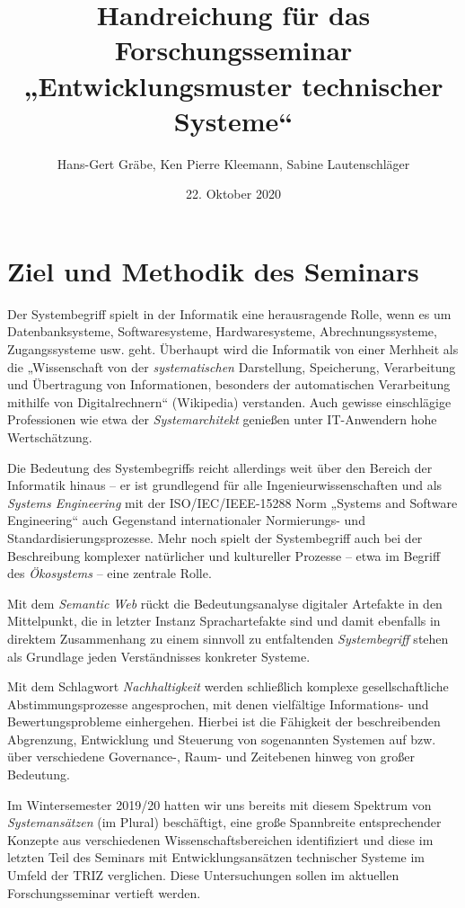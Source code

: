 \documentclass[11pt,a4paper]{article}
\title{Handreichung für das Forschungsseminar\\ „Entwicklungsmuster
  technischer Systeme“}
\author{Hans-Gert Gr\"abe, Ken Pierre Kleemann, Sabine Lautenschläger}
\date{22. Oktober 2020}
\begin{document}
\maketitle

\section{Ziel und Methodik des Seminars}

Der Systembegriff spielt in der Informatik eine herausragende Rolle, wenn es
um Datenbanksysteme, Softwaresysteme, Hardwaresysteme, Abrechnungssysteme,
Zugangssysteme usw. geht.  Überhaupt wird die Informatik von einer Merhheit
als die „Wissenschaft von der \emph{systematischen} Darstellung, Speicherung,
Verarbeitung und Übertragung von Informationen, besonders der automatischen
Verarbeitung mithilfe von Digitalrechnern“ (Wikipedia) verstanden.  Auch
gewisse einschlägige Professionen wie etwa der \emph{Systemarchitekt} genießen
unter IT-Anwendern hohe Wertschätzung.

Die Bedeutung des Systembegriffs reicht allerdings weit über den Bereich der
Informatik hinaus -- er ist grundlegend für alle Ingenieurwissenschaften und
als \emph{Systems Engineering} mit der ISO/IEC/IEEE-15288 Norm „Systems and
Software Engineering“ auch Gegenstand internationaler Normierungs- und
Standardisierungsprozesse.  Mehr noch spielt der Systembegriff auch bei der
Beschreibung komplexer natürlicher und kultureller Prozesse -- etwa im Begriff
des \emph{Ökosystems} -- eine zentrale Rolle.

Mit dem \emph{Semantic Web} rückt die Bedeutungsanalyse digitaler Artefakte in
den Mittelpunkt, die in letzter Instanz Sprachartefakte sind und damit
ebenfalls in direktem Zusammenhang zu einem sinnvoll zu entfaltenden
\emph{Systembegriff} stehen als Grundlage jeden Verständnisses konkreter
Systeme.

Mit dem Schlagwort \emph{Nachhaltigkeit} werden schließlich komplexe
gesellschaftliche Abstimmungsprozesse angesprochen, mit denen vielfältige
Informations- und Bewertungsprobleme einhergehen. Hierbei ist die Fähigkeit
der beschreibenden Abgrenzung, Entwicklung und Steuerung von sogenannten
Systemen auf bzw. über verschiedene Governance-, Raum- und Zeitebenen hinweg
von großer Bedeutung.

Im Wintersemester 2019/20 hatten wir uns bereits mit diesem Spektrum von
\emph{Systemansätzen} (im Plural) beschäftigt, eine große Spannbreite
entsprechender Konzepte aus verschiedenen Wissenschaftsbereichen identifiziert
und diese im letzten Teil des Seminars mit Entwicklungsansätzen technischer
Systeme im Umfeld der TRIZ verglichen.  Diese Untersuchungen sollen im
aktuellen Forschungsseminar vertieft werden.
\newpage
\end{document}
